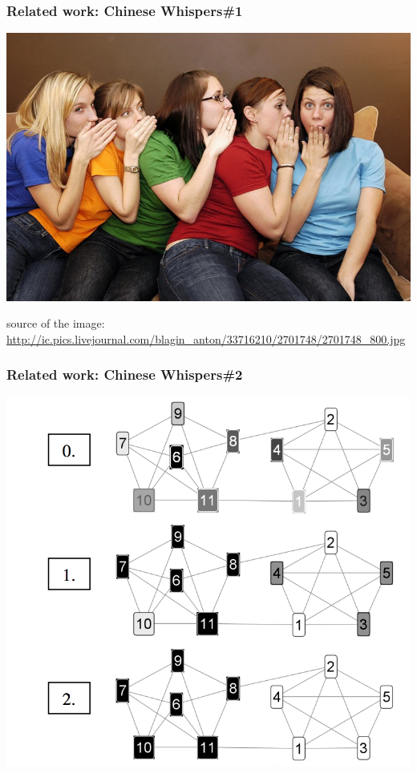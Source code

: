\documentclass{beamer}
\begin{document}
\begin{frame}[fragile]
\frametitle{Related work: Chinese Whispers\#1}
\begin{center}
 \includegraphics[height=0.5\textwidth]{cw}
 
  {\tiny * source of the image: \url{http://ic.pics.livejournal.com/blagin_anton/33716210/2701748/2701748_800.jpg}}
 \end{center}
\end{frame}



\begin{frame}[fragile]
\frametitle{Related work: Chinese Whispers\#2}
\begin{center}
 \includegraphics[height=0.59\textwidth]{cw2}
 
 \end{center}
\end{frame}
\end{document}
